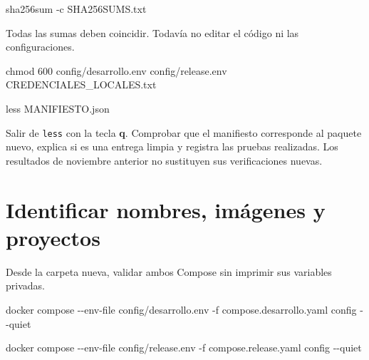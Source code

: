 \documentclass[
  spanish,
  10pt,
  a4paper,
]{article}
\newenvironment{Shaded}{}{}
\newcommand{\AttributeTok}[1]{#1}
\newcommand{\ExtensionTok}[1]{#1}
\newcommand{\FunctionTok}[1]{#1}
\newcommand{\NormalTok}[1]{#1}
\renewenvironment{Shaded}{\begin{snugshade}}{\end{snugshade}}%
\begin{document}
\begin{Shaded}
\begin{Highlighting}[]
\FunctionTok{sha256sum} \AttributeTok{{-}c}\NormalTok{ SHA256SUMS.txt}
\end{Highlighting}
\end{Shaded}

Todas las sumas deben coincidir. Todavía no editar el código ni las
configuraciones.

\begin{Shaded}
\begin{Highlighting}[]
\FunctionTok{chmod}\NormalTok{ 600 config/desarrollo.env config/release.env CREDENCIALES\_LOCALES.txt}
\end{Highlighting}
\end{Shaded}

\begin{Shaded}
\begin{Highlighting}[]
\FunctionTok{less}\NormalTok{ MANIFIESTO.json}
\end{Highlighting}
\end{Shaded}

Salir de \texttt{less} con la tecla \textbf{q}. Comprobar que el
manifiesto corresponde al paquete nuevo, explica si es una entrega
limpia y registra las pruebas realizadas. Los resultados de noviembre
anterior no sustituyen sus verificaciones nuevas.

\clearpage

\section{Identificar nombres, imágenes y
proyectos}\label{identificar-nombres-imuxe1genes-y-proyectos}

Desde la carpeta nueva, validar ambos Compose sin imprimir sus variables
privadas.

\begin{Shaded}
\begin{Highlighting}[]
\ExtensionTok{docker}\NormalTok{ compose }\AttributeTok{{-}{-}env{-}file}\NormalTok{ config/desarrollo.env }\AttributeTok{{-}f}\NormalTok{ compose.desarrollo.yaml config }\AttributeTok{{-}{-}quiet}
\end{Highlighting}
\end{Shaded}

\begin{Shaded}
\begin{Highlighting}[]
\ExtensionTok{docker}\NormalTok{ compose }\AttributeTok{{-}{-}env{-}file}\NormalTok{ config/release.env }\AttributeTok{{-}f}\NormalTok{ compose.release.yaml config }\AttributeTok{{-}{-}quiet}
\end{Highlighting}
\end{Shaded}
\end{document}
